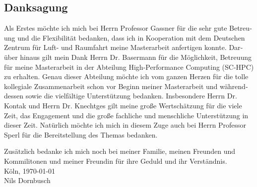 \documentclass[12pt,a4paper,twoside, open=right]{scrreprt}
\theoremstyle{definition}
\theoremstyle{plain}
\begin{document}
\begin{otherlanguage}{ngerman}
  

\chapter*{Danksagung}
Als Erstes möchte ich mich bei Herrn Professor Gassner für die sehr gute Betreuung und die Flexibilität bedanken, dass ich in Kooperation mit dem Deutschen Zentrum für Luft- und Raumfahrt meine Masterarbeit anfertigen konnte. Darüber hinaus gilt mein Dank Herrn Dr. Basermann für die Möglichkeit, Betreuung für meine Masterarbeit in der Abteilung High-Performance Computing (SC-HPC) zu erhalten. Genau dieser Abteilung möchte ich vom ganzen Herzen für die tolle kollegiale Zusammenarbeit schon vor Beginn meiner Masterarbeit und währenddessen sowie die vielfältige Unterstützung bedanken. Insbesondere Herrn Dr. Kontak und Herrn Dr. Knechtges gilt meine große Wertschätzung für die viele Zeit, das Engagement und die große fachliche und menschliche Unterstützung in dieser Zeit. Natürlich möchte ich mich in diesem Zuge auch bei Herrn Professor Sperl für die Bereitstellung des Themas bedanken. \par
Zusätzlich bedanke ich mich noch bei meiner Familie, meinen Freunden und Kommilitonen und meiner Freundin für ihre Geduld und ihr Verständnis.
\\[1cm]
Köln, \today 
\\[1cm]
Nils Dornbusch
\end{otherlanguage}
\newpage
\tableofcontents
\newpage
\end{document}
